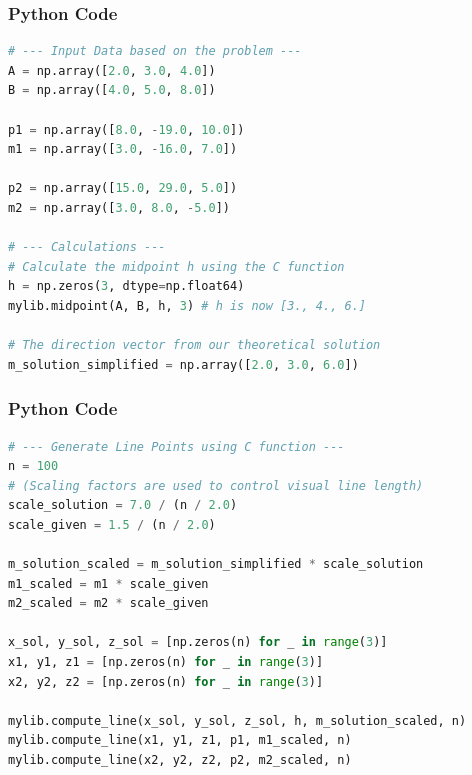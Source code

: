 \documentclass{beamer}
\begin{document}
\begin{frame}[fragile]
  \frametitle{Python Code}
  \begin{lstlisting}[language=Python]
# --- Input Data based on the problem ---
A = np.array([2.0, 3.0, 4.0])
B = np.array([4.0, 5.0, 8.0])

p1 = np.array([8.0, -19.0, 10.0])
m1 = np.array([3.0, -16.0, 7.0])

p2 = np.array([15.0, 29.0, 5.0])
m2 = np.array([3.0, 8.0, -5.0])

# --- Calculations ---
# Calculate the midpoint h using the C function
h = np.zeros(3, dtype=np.float64)
mylib.midpoint(A, B, h, 3) # h is now [3., 4., 6.]

# The direction vector from our theoretical solution
m_solution_simplified = np.array([2.0, 3.0, 6.0])
  \end{lstlisting}
\end{frame}
\begin{frame}[fragile]
  \frametitle{Python Code}
  \begin{lstlisting}[language=Python]
# --- Generate Line Points using C function ---
n = 100
# (Scaling factors are used to control visual line length)
scale_solution = 7.0 / (n / 2.0)
scale_given = 1.5 / (n / 2.0)

m_solution_scaled = m_solution_simplified * scale_solution
m1_scaled = m1 * scale_given
m2_scaled = m2 * scale_given

x_sol, y_sol, z_sol = [np.zeros(n) for _ in range(3)]
x1, y1, z1 = [np.zeros(n) for _ in range(3)]
x2, y2, z2 = [np.zeros(n) for _ in range(3)]

mylib.compute_line(x_sol, y_sol, z_sol, h, m_solution_scaled, n)
mylib.compute_line(x1, y1, z1, p1, m1_scaled, n)
mylib.compute_line(x2, y2, z2, p2, m2_scaled, n)
  \end{lstlisting}
\end{frame}
\end{document}
